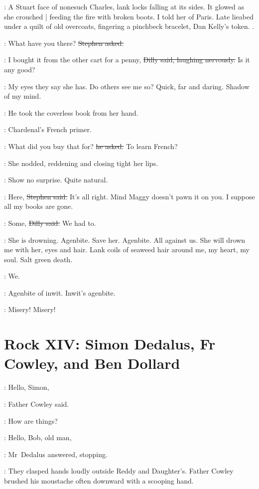 \StephenInt:
A Stuart face of nonesuch Charles,
lank locks falling at its sides.
It glowed as she crouched |
feeding the fire with broken boots.
I told her of Paris.%
Late lieabed under a quilt of old overcoats,
fingering a pinchbeck bracelet,
Dan Kelly's token.
.

\Stephen:
What have you there?
\sout{Stephen asked.}

\dilly:
I bought it from the other cart for a penny,
\sout{Dilly said, laughing nervously.}
Is it any good?

\StephenInt:
My eyes they say she has.
Do others see me so?
Quick, far and daring.
Shadow of my mind.

:
He took the coverless book from her hand.

\StephenInt:
Chardenal's French primer.

\Stephen:
What did you buy that for?
\sout{he asked.}
To learn French?

:
She nodded,%
reddening and closing tight her lips.

\StephenInt:
Show no surprise.
Quite natural.

\Stephen:
Here,
\sout{Stephen said.}
It's all right.
Mind Maggy doesn't pawn it on you.
I suppose all my books are gone.

\dilly:
Some,
\sout{Dilly said.}
We had to.

\StephenInt:
She is drowning.
Agenbite.
Save her.
Agenbite.
All against us.
She will drown me with her,
eyes and hair.
Lank coils of seaweed hair around me,
my heart,
my soul.
Salt green death.

\StephenInt:
We.

\StephenInt:
Agenbite of inwit.
Inwit's agenbite.

\StephenInt:
Misery!%
Misery!


\section*{Rock XIV: Simon Dedalus, Fr Cowley, and Ben Dollard}


\cowley:
Hello, Simon,

:
Father Cowley said.

\cowley:
How are things?

\simon:
Hello, Bob, old man,

:
Mr~Dedalus answered,
stopping.

:
They clasped hands loudly outside Reddy and Daughter's.
Father Cowley brushed his moustache often downward
with a scooping hand.

